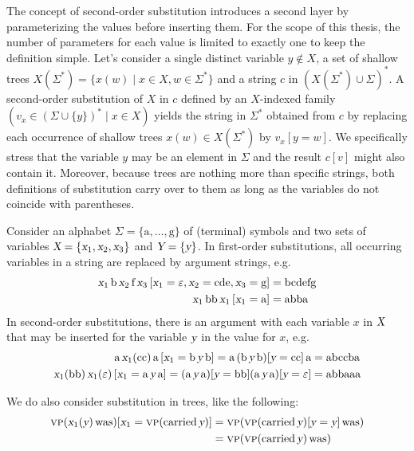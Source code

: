 \documentclass[../document.tex]{subfiles}
\begin{document}
    The concept of second-order substitution introduces a second layer by parameterizing the values before inserting them.
    For the scope of this thesis, the number of parameters for each value is limited to exactly one to keep the definition simple.
    Let's consider a single distinct variable \(y \notin X\), a set of shallow trees \(X(\varSigma^*) = \{ x(w) \mid x \in X, w \in \Sigma^* \}\) and a string \(c\) in \((X(\varSigma^*) \cup \varSigma)^*\).
    A second-order substitution of \(X\) in \(c\) defined by an \(X\)-indexed family \((v_x \in (\varSigma \cup \{y\})^* \mid x \in X)\) yields the string in \(\varSigma^*\) obtained from \(c\) by replacing each occurrence of shallow trees \(x(w) \in X(\varSigma^*)\) by \(v_x[y=w]\).
    We specifically stress that the variable \(y\) may be an element in \(\varSigma\) and the result \(c[v]\) might also contain it.
    Moreover, because trees are nothing more than specific strings, both definitions of substitution carry over to them as long as the variables do not coincide with parentheses.

    \begin{example}[Substitution]
        Consider an alphabet \(\Sigma = \{\text{a}, \ldots, \text{g}\}\) of (terminal) symbols and two sets of variables \(\textsl{X} = \{\textsl{x}_1, \textsl{x}_2, \textsl{x}_3\}\) and \(\textsl{Y} = \{\textsl{y}\}\).
        In first-order substitutions, all occurring variables in a string are replaced by argument strings, e.g.
        \begin{align*}
            \textsl{x}_1 \, \text{b} \, \textsl{x}_2 \, \text{f} \, \textsl{x}_3\,[\textsl{x}_1=\varepsilon, \textsl{x}_2=\text{cde}, \textsl{x}_3=\text{g}] &= \text{bcdefg} \\
            \textsl{x}_1 \, \text{bb} \, \textsl{x}_1 \, [\textsl{x}_1=\text{a}] &= \text{abba}
        \end{align*}
        In second-order substitutions, there is an argument with each variable \(x\) in \(\textsl{X}\) that may be inserted for the variable \(\textsl{y}\) in the value for \(x\), e.g.
        \begin{align*}
            \text{a} \, \textsl{x}_1(\text{cc}) \, \text{a} \, [\textsl{x}_1=\text{b}\,\textsl{y}\,\text{b}] = \text{a} \, (\text{b}\,\textsl{y}\,\text{b})[\textsl{y}=\text{cc}] \, \text{a} &= \text{abccba} \\
            \textsl{x}_1(\text{bb}) \, \textsl{x}_1(\varepsilon) \, [\textsl{x}_1=\text{a}\,\textsl{y}\,\text{a}] = (\text{a}\,\textsl{y}\,\text{a})[\textsl{y}=\text{bb}] (\text{a}\,\textsl{y}\,\text{a})[\textsl{y}=\varepsilon] &= \text{abbaaa}
        \end{align*}

        We do also consider substitution in trees, like the following:
        \begin{align*}
            \textsc{vp}( \textsl{x}_1(\textsl{y}) \, \text{was} )[\textsl{x}_1=\textsc{vp}(\text{carried}\,\textsl{y})]
                &= \textsc{vp}( \textsc{vp}(\text{carried}\,\textsl{y})[\textsl{y}=\textsl{y}] \, \text{was} ) \\
                &= \textsc{vp}(\textsc{vp}(\text{carried}\,\textsl{y})\,\text{was})
        \end{align*}
    \end{example}
\end{document}
